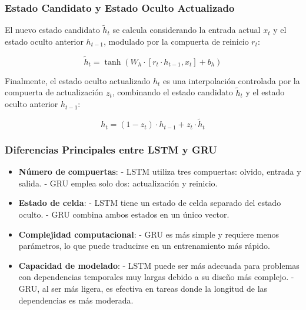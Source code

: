 \subsubsection{Estado Candidato y Estado Oculto Actualizado}

El nuevo estado candidato \(\tilde{h}_t\) se calcula considerando la entrada actual \(x_t\) y el estado oculto anterior \(h_{t-1}\), modulado por la compuerta de reinicio \(r_t\):

\begin{equation}
    \tilde{h}_t = \tanh(W_h \cdot [r_t \cdot h_{t-1}, x_t] + b_h)
\end{equation}

Finalmente, el estado oculto actualizado \(h_t\) es una interpolación controlada por la compuerta de actualización \(z_t\), combinando el estado candidato \(\tilde{h}_t\) y el estado oculto anterior \(h_{t-1}\):

\begin{equation}
    h_t = (1 - z_t) \cdot h_{t-1} + z_t \cdot \tilde{h}_t
\end{equation}

\subsubsection{Diferencias Principales entre LSTM y GRU}

\begin{itemize}
    \item \textbf{Número de compuertas}:  
        - LSTM utiliza tres compuertas: olvido, entrada y salida.  
        - GRU emplea solo dos: actualización y reinicio.  

    \item \textbf{Estado de celda}:  
        - LSTM tiene un estado de celda separado del estado oculto.  
        - GRU combina ambos estados en un único vector.  

    \item \textbf{Complejidad computacional}:  
        - GRU es más simple y requiere menos parámetros, lo que puede traducirse en un entrenamiento más rápido.  

    \item \textbf{Capacidad de modelado}:  
        - LSTM puede ser más adecuada para problemas con dependencias temporales muy largas debido a su diseño más complejo.  
        - GRU, al ser más ligera, es efectiva en tareas donde la longitud de las dependencias es más moderada.
\end{itemize}

